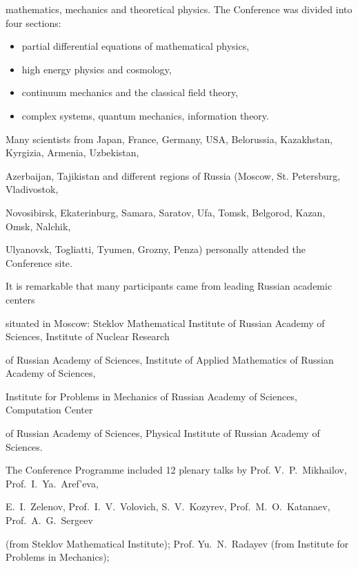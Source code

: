 mathematics, mechanics and theoretical physics. The Conference was divided into four sections:

\begin{itemize}

\item partial differential equations of mathematical physics,

\item high energy physics and cosmology,

\item continuum mechanics and the classical field theory,

\item complex systems, quantum mechanics, information theory.

\end{itemize}



Many scientists from Japan, France, Germany, USA, Belorussia, Kazakhstan, Kyrgizia, Armenia, Uzbekistan,

Azerbaijan, Tajikistan and different regions of Russia (Moscow, St. Petersburg, Vladivostok,

Novosibirsk, Ekaterinburg, Samara, Saratov, Ufa, Tomsk, Belgorod, Kazan, Omsk, Nalchik,

Ulyanovsk, Togliatti, Tyumen, Grozny, Penza) personally attended the Conference site.

It is remarkable that many participants came from leading Russian academic centers

situated in Moscow: Steklov Mathematical Institute of Russian Academy of Sciences, Institute of Nuclear Research

of Russian Academy of Sciences, Institute of Applied Mathematics of Russian Academy of Sciences,

Institute for Problems in Mechanics of Russian Academy of Sciences, Computation Center

of Russian Academy of Sciences, Physical Institute of Russian Academy of Sciences.





The Conference Programme included 12 plenary talks by Prof. V.~P.~Mikhailov, Prof.~I.~Ya.~Aref'eva,

E.~I.~Zelenov, Prof.~I.~V.~Volovich, S.~V.~Kozyrev, \linebreak Prof.~M.~O.~Katanaev, Prof.~A.~G.~Sergeev

(from Steklov Mathematical Institute); Prof. Yu.~N.~Radayev (from Institute for Problems in Mechanics);

